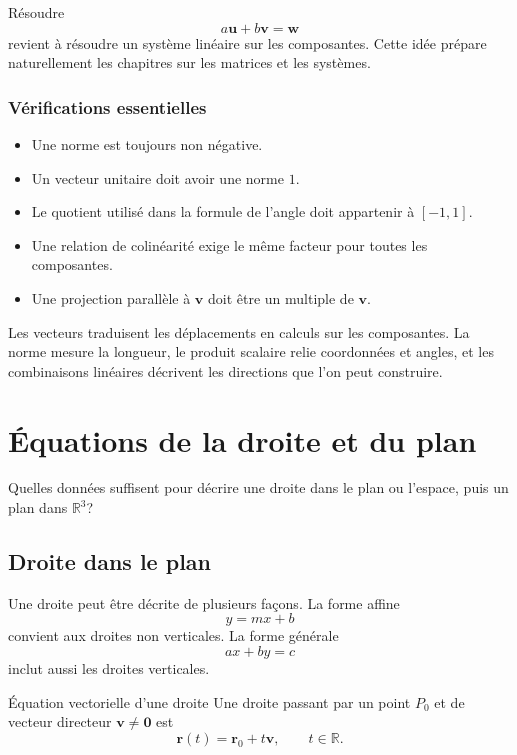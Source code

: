 \documentclass[12pt,a4paper,openany]{book}
\newcommand{\R}{\mathbb{R}}
\begin{document}
Résoudre
\[
a\mathbf u+b\mathbf v=\mathbf w
\]
revient à résoudre un système linéaire sur les composantes. Cette idée prépare naturellement les chapitres sur les matrices et les systèmes.

\subsection{Vérifications essentielles}

\begin{itemize}
\item Une norme est toujours non négative.
\item Un vecteur unitaire doit avoir une norme $1$.
\item Le quotient utilisé dans la formule de l'angle doit appartenir à $[-1,1]$.
\item Une relation de colinéarité exige le même facteur pour toutes les composantes.
\item Une projection parallèle à $\mathbf v$ doit être un multiple de $\mathbf v$.
\end{itemize}

\begin{summarybox}
Les vecteurs traduisent les déplacements en calculs sur les composantes. La norme mesure la longueur, le produit scalaire relie coordonnées et angles, et les combinaisons linéaires décrivent les directions que l'on peut construire.
\end{summarybox}


\chapter{Équations de la droite et du plan}

\begin{questionbox}
Quelles données suffisent pour décrire une droite dans le plan ou l'espace, puis un plan dans $\R^3$?
\end{questionbox}

\section{Droite dans le plan}

Une droite peut être décrite de plusieurs façons. La forme affine
\[
y=mx+b
\]
convient aux droites non verticales. La forme générale
\[
ax+by=c
\]
inclut aussi les droites verticales.

\begin{definition}{Équation vectorielle d'une droite}{}
Une droite passant par un point $P_0$ et de vecteur directeur $\mathbf v\neq\mathbf0$ est
\[
\mathbf r(t)=\mathbf r_0+t\mathbf v,
\qquad t\in\R.
\]
\end{definition}
\end{document}
